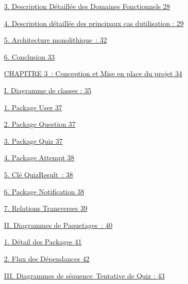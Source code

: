 \documentclass[12pt,a4paper,twoside]{report}
\begin{document}
\protect\hyperlink{description-duxe9tailluxe9e-des-domaines-fonctionnels}{3.
Description Détaillée des Domaines Fonctionnels
\protect\hyperlink{description-duxe9tailluxe9e-des-domaines-fonctionnels}{28}}

\protect\hyperlink{description-duxe9tailluxe9e-des-principaux-cas-dutilisation}{4.
Description détaillée des principaux cas d\textquotesingle utilisation :
\protect\hyperlink{description-duxe9tailluxe9e-des-principaux-cas-dutilisation}{29}}

\protect\hyperlink{architecture-monolithique}{5. Architecture
monolithique~: \protect\hyperlink{architecture-monolithique}{32}}

\protect\hyperlink{conclusion-1}{6. Conclusion
\protect\hyperlink{conclusion-1}{33}}

\protect\hyperlink{section-3}{CHAPITRE 3~: Conception et Mise en place
du projet \protect\hyperlink{section-3}{34}}

\protect\hyperlink{diagramme-de-classes}{I. Diagramme de classes :
\protect\hyperlink{diagramme-de-classes}{35}}

\protect\hyperlink{package-user}{1. Package User
\protect\hyperlink{package-user}{37}}

\protect\hyperlink{package-question}{2. Package Question
\protect\hyperlink{package-question}{37}}

\protect\hyperlink{package-quiz}{3. Package Quiz
\protect\hyperlink{package-quiz}{37}}

\protect\hyperlink{package-attempt}{4. Package Attempt
\protect\hyperlink{package-attempt}{38}}

\protect\hyperlink{cluxe9-quizresult}{5. Clé QuizResult~:
\protect\hyperlink{cluxe9-quizresult}{38}}

\protect\hyperlink{package-notification}{6. Package Notification
\protect\hyperlink{package-notification}{38}}

\protect\hyperlink{relations-transverses}{7. Relations Transverses
\protect\hyperlink{relations-transverses}{39}}

\protect\hyperlink{diagrammes-de-paquetages}{II. Diagrammes de
Paquetages~: \protect\hyperlink{diagrammes-de-paquetages}{40}}

\protect\hyperlink{duxe9tail-des-packages}{1. Détail des Packages
\protect\hyperlink{duxe9tail-des-packages}{41}}

\protect\hyperlink{flux-des-duxe9pendances}{2. Flux des Dépendances
\protect\hyperlink{flux-des-duxe9pendances}{42}}

\protect\hyperlink{diagrammes-de-suxe9quence-tentative-de-quiz}{III.
Diagrammes de séquence~Tentative de Quiz :
\protect\hyperlink{diagrammes-de-suxe9quence-tentative-de-quiz}{43}}
\end{document}
